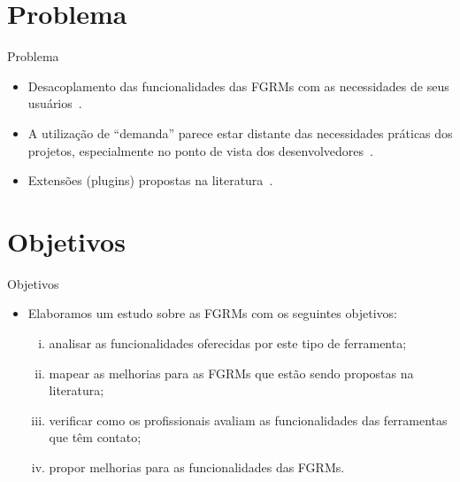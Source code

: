 \documentclass[t,14pt,mathserif]{beamer}
\begin{document}
\section{Problema}

\begin{frame}{Problema}
	\begin{itemize}

        \item Desacoplamento das funcionalidades das FGRMs com as necessidades
              de seus usuários~\cite{baysal2012qualitative, just2008towards}.

        \item A utilização de  ``demanda'' parece estar distante das
              necessidades práticas dos projetos, especialmente no ponto de vista
              dos desenvolvedores~\cite{Baysal:2013:SAP:2486788.2486957}.

        \item Extensões (plugins) propostas na
              literatura~\cite{101186,Thung:2014:BIT:2635868.2661678,Kononenko:2014:DED:2591062.2591075}.
	\end{itemize}
\end{frame}

\section{Objetivos}

\begin{frame}{Objetivos}
	\begin{itemize}
        \item Elaboramos um estudo sobre as FGRMs com os seguintes objetivos:
            \begin{enumerate}[(i)]
                \item analisar as funcionalidades oferecidas por este tipo de
                      ferramenta;
                \item mapear as melhorias para as FGRMs que estão sendo
                      propostas na literatura;
                \item verificar como os profissionais avaliam as
                      funcionalidades das ferramentas que têm contato;
                \item propor melhorias para as funcionalidades das FGRMs\@.
            \end{enumerate}
	\end{itemize}
\end{frame}
\end{document}

